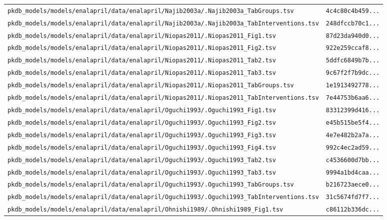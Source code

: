 \documentclass{article}
\begin{document}
\begin{longtable}{ll}
\texttt{pkdb\_models/models/enalapril/data/enalapril/Najib2003a/.Najib2003a\_TabGroups.tsv} & \texttt{4c4c80c4b459...} \\
\texttt{pkdb\_models/models/enalapril/data/enalapril/Najib2003a/.Najib2003a\_TabInterventions.tsv} & \texttt{248dfccb70c1...} \\
\texttt{pkdb\_models/models/enalapril/data/enalapril/Niopas2011/.Niopas2011\_Fig1.tsv} & \texttt{87d23da940d0...} \\
\texttt{pkdb\_models/models/enalapril/data/enalapril/Niopas2011/.Niopas2011\_Fig2.tsv} & \texttt{922e259ccaf8...} \\
\texttt{pkdb\_models/models/enalapril/data/enalapril/Niopas2011/.Niopas2011\_Tab2.tsv} & \texttt{5ddfc6849b7b...} \\
\texttt{pkdb\_models/models/enalapril/data/enalapril/Niopas2011/.Niopas2011\_Tab3.tsv} & \texttt{9c67f2f7b9dc...} \\
\texttt{pkdb\_models/models/enalapril/data/enalapril/Niopas2011/.Niopas2011\_TabGroups.tsv} & \texttt{1e1913492778...} \\
\texttt{pkdb\_models/models/enalapril/data/enalapril/Niopas2011/.Niopas2011\_TabInterventions.tsv} & \texttt{7e44753b6aa6...} \\
\texttt{pkdb\_models/models/enalapril/data/enalapril/Oguchi1993/.Oguchi1993\_Fig1.tsv} & \texttt{83312399d416...} \\
\texttt{pkdb\_models/models/enalapril/data/enalapril/Oguchi1993/.Oguchi1993\_Fig2.tsv} & \texttt{e45b515be5f4...} \\
\texttt{pkdb\_models/models/enalapril/data/enalapril/Oguchi1993/.Oguchi1993\_Fig3.tsv} & \texttt{4e7e482b2a7a...} \\
\texttt{pkdb\_models/models/enalapril/data/enalapril/Oguchi1993/.Oguchi1993\_Fig4.tsv} & \texttt{992c4ec2ad59...} \\
\texttt{pkdb\_models/models/enalapril/data/enalapril/Oguchi1993/.Oguchi1993\_Tab2.tsv} & \texttt{c4536600d7bb...} \\
\texttt{pkdb\_models/models/enalapril/data/enalapril/Oguchi1993/.Oguchi1993\_Tab3.tsv} & \texttt{9994a1bd4caa...} \\
\texttt{pkdb\_models/models/enalapril/data/enalapril/Oguchi1993/.Oguchi1993\_TabGroups.tsv} & \texttt{b216723aece0...} \\
\texttt{pkdb\_models/models/enalapril/data/enalapril/Oguchi1993/.Oguchi1993\_TabInterventions.tsv} & \texttt{31c5674fd7f7...} \\
\texttt{pkdb\_models/models/enalapril/data/enalapril/Ohnishi1989/.Ohnishi1989\_Fig1.tsv} & \texttt{c86112b336dc...} \\

\end{longtable}
\end{document}

